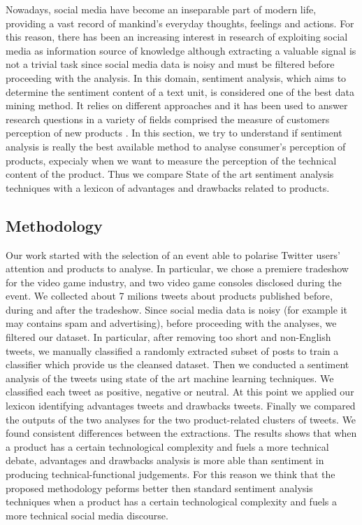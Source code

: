\documentclass[]{book}
\begin{document}
Nowadays, social media have become an inseparable part of modern life,
providing a vast record of mankind's everyday thoughts, feelings and
actions. For this reason, there has been an increasing interest in
research of exploiting social media as information source of knowledge
although extracting a valuable signal is not a trivial task since social
media data is noisy and must be filtered before proceeding with the
analysis. In this domain, sentiment analysis, which aims to determine
the sentiment content of a text unit, is considered one of the best data
mining method. It relies on different approaches
\citep{collomb2014study} and it has been used to answer research
questions in a variety of fields comprised the measure of customers
perception of new products \citep{mirtalaie2018extracting}. In this
section, we try to understand if sentiment analysis is really the best
available method to analyse consumer's perception of products, expecialy
when we want to measure the perception of the technical content of the
product. Thus we compare State of the art sentiment analysis techniques
with a lexicon of advantages and drawbacks related to products.

\subsection{Methodology}\label{methodology-8}

Our work started with the selection of an event able to polarise Twitter
users' attention and products to analyse. In particular, we chose a
premiere tradeshow for the video game industry, and two video game
consoles disclosed during the event. We collected about 7 milions tweets
about products published before, during and after the tradeshow. Since
social media data is noisy (for example it may contains spam and
advertising), before proceeding with the analyses, we filtered our
dataset. In particular, after removing too short and non-English tweets,
we manually classified a randomly extracted subset of posts to train a
classifier which provide us the cleansed dataset. Then we conducted a
sentiment analysis of the tweets using state of the art machine learning
techniques. We classified each tweet as positive, negative or neutral.
At this point we applied our lexicon identifying advantages tweets and
drawbacks tweets. Finally we compared the outputs of the two analyses
for the two product-related clusters of tweets. We found consistent
differences between the extractions. The results shows that when a
product has a certain technological complexity and fuels a more
technical debate, advantages and drawbacks analysis is more able than
sentiment in producing technical-functional judgements. For this reason
we think that the proposed methodology peforms better then standard
sentiment analysis techniques when a product has a certain technological
complexity and fuels a more technical social media discourse.
\end{document}
